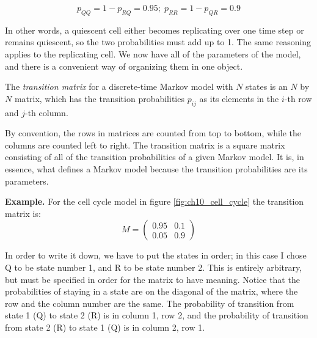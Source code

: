 \documentclass[
  letterpaper,
  DIV=11,
  numbers=noendperiod]{scrreprt}
\begin{document}
\[
p_{QQ} = 1 - p_{RQ} = 0.95; \; p_{RR} = 1 - p_{QR} = 0.9
\]

In other words, a quiescent cell either becomes replicating over one
time step or remains quiescent, so the two probabilities must add up to
1. The same reasoning applies to the replicating cell. We now have all
of the parameters of the model, and there is a convenient way of
organizing them in one object.

\begin{tcolorbox}[enhanced jigsaw, arc=.35mm, colframe=quarto-callout-note-color-frame, left=2mm, opacitybacktitle=0.6, breakable, title=\textcolor{quarto-callout-note-color}{\faInfo}\hspace{0.5em}{Definition}, toprule=.15mm, coltitle=black, bottomtitle=1mm, toptitle=1mm, colback=white, leftrule=.75mm, colbacktitle=quarto-callout-note-color!10!white, titlerule=0mm, opacityback=0, rightrule=.15mm, bottomrule=.15mm]

The \emph{transition matrix} for a discrete-time Markov model with \(N\)
states is an \(N\) by \(N\) matrix, which has the transition
probabilities \(p_{ij}\) as its elements in the \(i\)-th row and
\(j\)-th column.

\end{tcolorbox}

By convention, the rows in matrices are counted from top to bottom,
while the columns are counted left to right. The transition matrix is a
square matrix consisting of all of the transition probabilities of a
given Markov model. It is, in essence, what defines a Markov model
because the transition probabilities are its parameters.

\textbf{Example.} For the cell cycle model in figure
\ref{fig:ch10_cell_cycle} the transition matrix is: \[ 
M = \left(\begin{array}{cc}0.95 & 0.1 \\0.05 & 0.9\end{array}\right)
\]

In order to write it down, we have to put the states in order; in this
case I chose Q to be state number 1, and R to be state number 2. This is
entirely arbitrary, but must be specified in order for the matrix to
have meaning. Notice that the probabilities of staying in a state are on
the diagonal of the matrix, where the row and the column number are the
same. The probability of transition from state 1 (Q) to state 2 (R) is
in column 1, row 2, and the probability of transition from state 2 (R)
to state 1 (Q) is in column 2, row 1.
\end{document}
